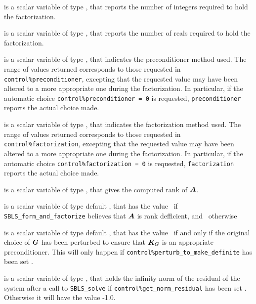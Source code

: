 \documentclass{galahad}
\newcommand{\packagename}{SBLS}
\begin{document}
\begin{description}

 is a scalar variable of type \longinteger,
that reports the number of integers required to hold the factorization.

 is a scalar variable of type \longinteger,
that reports the number of reals required to hold the factorization.

 is a scalar variable of type \integer,
that indicates the preconditioner method used. The range of values returned
corresponds to those requested in {\tt control\%preconditioner},
excepting that the requested value may have been altered to a more
appropriate one during the factorization. In particular, if the automatic
choice {\tt control\%preconditioner = 0} is requested,
{\tt preconditioner} reports the actual choice made.

 is a scalar variable of type \integer,
that indicates the factorization method used. The range of values returned
corresponds to those requested in {\tt control\%factorization},
excepting that the requested value may have been altered to a more
appropriate one during the factorization.
In particular, if the automatic
choice {\tt control\%factorization = 0} is requested,
{\tt factorization} reports the actual choice made.

 is a scalar variable of type \integer, that gives the
computed rank of ${\bm{A}}$.

 is a scalar variable of type default \logical, that has the
value \true\ if {\tt \packagename\_form\_and\_factorize} believes that
${\bm{A}}$ is rank defficient, and \false\ otherwise

 is a scalar variable of type default \logical, that has the
value \true\ if and only if the original choice of ${\bm{G}}$ has been perturbed to
ensure that ${\bm{K}}_G$ is an appropriate preconditioner. This will only
happen if {\tt control\-\%perturb\_to\_make\_definite} has been set \true.

 is a scalar variable of type \realdp,
that holds the infinity norm of the residual of the system 
after a call to {\tt \packagename\_solve} if {\tt control\%get\_norm\_residual}
has been set \true. Otherwise it will have the value -1.0.


\end{description}
\end{document}

